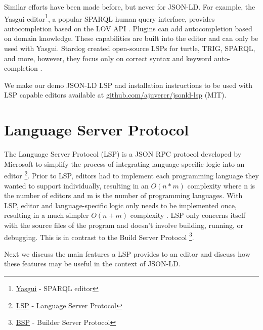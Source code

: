 \documentclass[
]{ceurart}
\begin{document}
Similar efforts have been made before, but never for JSON-LD. For example, the Yasgui editor\footnote{\href{https://triply.cc/docs/yasgui/}{Yasgui} - SPARQL editor}, a popular SPARQL human query interface, provides autocompletion based on the LOV API \cite{LOV}. Plugins can add autocompletion based on domain knowledge. These capabilities are built into the editor and can only be used with Yasgui.
Stardog created open-source LSPs for turtle, TRIG, SPARQL, and more, however, they focus only on correct syntax and keyword auto-completion \cite{stardog}. 

We make our demo JSON-LD LSP and installation instructions to be used with LSP capable editors available at \href{github.com/ajuvercr/jsonld-lsp](https://github.com/ajuvercr/jsonld-lsp}{github.com/ajuvercr/jsonld-lsp} (MIT).


\section{Language Server Protocol}

The Language Server Protocol (LSP) is a JSON RPC protocol developed by Microsoft to simplify the process of integrating language-specific logic into an editor \footnote{\href{https://microsoft.github.io/language-server-protocol/}{LSP} - Language Server Protocol}. 
Prior to LSP, editors had to implement each programming language they wanted to support individually, resulting in an \(O(n*m)\) complexity where n is the number of editors and m is the number of programming languages.
With LSP, editor and language-specific logic only needs to be implemented once, resulting in a much simpler \(O(n+m)\) complexity \cite{LSP-Multi}.
LSP only concerns itself with the source files of the program and doesn't involve building, running, or debugging.
This is in contrast to the Build Server Protocol \footnote{\href{https://github.com/build-server-protocol/build-server-protocol}{BSP} - Builder Server Protocol}.

Next we discuss the main features a LSP provides to an editor and discuss how these features may be useful in the context of JSON-LD.
\end{document}
